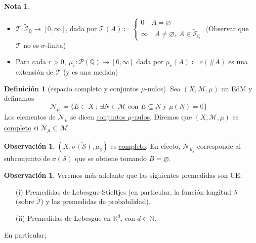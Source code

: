 \documentclass[11pt]{article}
\theoremstyle{definition} %
\newtheorem{definition}[theorem]{Definición}
\newtheorem{remark}[theorem]{Observación}
\newtheorem{note}[theorem]{Nota}
\newcommand{\R}{\mathbb{R}}
\newcommand{\N}{\mathbb{N}}
\newcommand{\Q}{\mathbb{Q}}
\begin{document}
\begin{property}
\begin{note}
\begin{itemize}
	\item $\mathcal{T} : \widetilde{\mathcal{I}}_{\Q} \to [0,\infty]$, dada por $\mathcal{T}(A) \coloneq \begin{cases}
			0 \quad A = \varnothing \\
			\infty \quad A \neq \varnothing,\ A \in \widetilde{\mathcal{I}}_{\Q}
		\end{cases}$ (Observar que $\mathcal{T}$ no es $\sigma$-finita)

		\item Para cada $r > 0,\ \mu_r : \mathcal{P}(\Q) \to [0,\infty]$ dada por $\mu_r(A) \coloneq r(\# A)$ es una extensión de $\mathcal{T}$ (y es una medida)
	\end{itemize}
\end{note}

\begin{definition}[espacio completo y conjuntos $\mu$-nulos]
	Sea $(X,\mathscr{M},\mu)$ un EdM y definamos 
	\[ \mathscr{N}_{\mu} \coloneq \{ E \subset X \ : \ \exists N \in \mathscr{M} \text{ con } E \subseteq N \text{ y } \mu(N) = 0 \} \] 
	Los elementos de $\mathscr{N}_{\mu}$ se dicen \underline{conjuntos $\mu$-nulos}. Diremos que $(X,\mathscr{M},\mu)$ es \underline{completo} si $\mathscr{N}_{\mu} \subseteq \mathscr{M}$
\end{definition}

\begin{remark}
	$(X,\overline{\sigma(\mathscr{S})},\overline{\mu_{\delta}})$ es \underline{completo}. En efecto, $\mathscr{N}_{\overline{\mu_{\delta}}}$ corresponde al subconjunto de $\overline{\sigma(\mathscr{S})}$ que se obtiene tomando $B=\varnothing$.
\end{remark}

\begin{remark}
	Veremos más adelante que las siguientes premedidas son UE:

	\begin{itemize}
		\item[(i)] Premedidas de Lebesgue-Stieltjes (en particular, la función longitud $\lambda$ (sobre $\widetilde{\mathcal{I}}$) y las premedidas de probabilidad).

		\item[(ii)] Premedidas de Lebesgue en $\R^d$, con $d \in \N$.
	\end{itemize}
\end{remark}

\noindent En particular;


\end{property}
\end{document}
